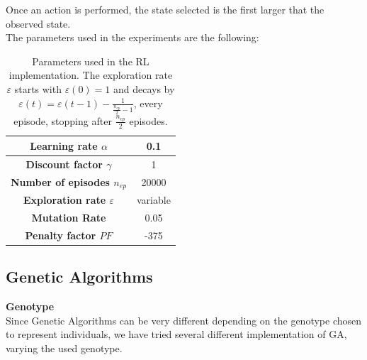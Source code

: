 Once an action is performed, the state selected is the first larger that the observed state.\\
The parameters used in the experiments are the following:


\begin{table}[htb]%
	\centering
	\label{tab:RL_parameters}
	\begin{tabular}{|S|S|} 		%
		
		\hline
		{\textbf{Learning rate $\alpha$}} &  {0.1} \\
		\hline
		{\textbf{Discount factor $\gamma$}} & {1} \\
		\hline
		{\textbf{Number of episodes $n_{ep}$}} & {20000} \\
		\hline
		{\textbf{Exploration rate $\varepsilon$}}  & {variable} \\
		\hline
		{\textbf{Mutation Rate}} & {0.05} \\
		\hline
		{\textbf{Penalty factor $PF$}}& {-375} \\
		\hline
		
	\end{tabular}
	\caption{Parameters used in the RL implementation. The exploration rate $\varepsilon$ starts with $\varepsilon(0)=1$ and decays by $\varepsilon(t) = \varepsilon(t - 1) - \frac{1}{\frac{n_{ep}}{2} - 1}$, every episode, stopping after $\frac{n_{ep}}{2}$ episodes. }
\end{table}



\subsection{Genetic Algorithms}

\textbf{Genotype}\\
Since Genetic Algorithms can be very different depending on the genotype chosen to represent individuals, we have tried several different implementation of GA, varying the used genotype.
\\

